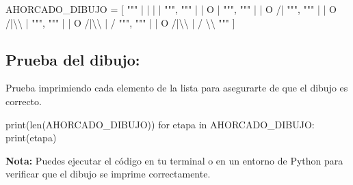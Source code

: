 \documentclass[
  a4paper,
  DIV=11,
  numbers=noendperiod,
  onepage,
  openany]{scrreprt}
\newenvironment{Shaded}{\begin{snugshade}}{\end{snugshade}}
\newcommand{\BuiltInTok}[1]{\textcolor[rgb]{0.00,0.23,0.31}{#1}}
\newcommand{\CharTok}[1]{\textcolor[rgb]{0.13,0.47,0.30}{#1}}
\newcommand{\ControlFlowTok}[1]{\textcolor[rgb]{0.00,0.23,0.31}{#1}}
\newcommand{\KeywordTok}[1]{\textcolor[rgb]{0.00,0.23,0.31}{#1}}
\newcommand{\NormalTok}[1]{\textcolor[rgb]{0.00,0.23,0.31}{#1}}
\newcommand{\OperatorTok}[1]{\textcolor[rgb]{0.37,0.37,0.37}{#1}}
\newcommand{\StringTok}[1]{\textcolor[rgb]{0.13,0.47,0.30}{#1}}
\begin{document}
\begin{Shaded}
\begin{Highlighting}[]
\NormalTok{AHORCADO\_DIBUJO }\OperatorTok{=}\NormalTok{ [}
    \StringTok{"""}
\StringTok{       |}
\StringTok{       |}
\StringTok{       |}
\StringTok{       |}
\StringTok{    """}\NormalTok{,}
    \StringTok{"""}
\StringTok{       |}
\StringTok{       |}
\StringTok{       O}
\StringTok{       |}
\StringTok{    """}\NormalTok{,}
    \StringTok{"""}
\StringTok{       |}
\StringTok{       |}
\StringTok{       O}
\StringTok{      /|}
\StringTok{    """}\NormalTok{,}
    \StringTok{"""}
\StringTok{       |}
\StringTok{       |}
\StringTok{       O}
\StringTok{      /|}\CharTok{\textbackslash{}\textbackslash{}}
\StringTok{       |}
\StringTok{    """}\NormalTok{,}
    \StringTok{"""}
\StringTok{       |}
\StringTok{       |}
\StringTok{       O}
\StringTok{      /|}\CharTok{\textbackslash{}\textbackslash{}}
\StringTok{       |}
\StringTok{      /}
\StringTok{    """}\NormalTok{,}
    \StringTok{"""}
\StringTok{       |}
\StringTok{       |}
\StringTok{       O}
\StringTok{      /|}\CharTok{\textbackslash{}\textbackslash{}}
\StringTok{       |}
\StringTok{      / }\CharTok{\textbackslash{}\textbackslash{}}
\StringTok{    """}
\NormalTok{]}
\end{Highlighting}
\end{Shaded}

\subsection{Prueba del dibujo:}\label{prueba-del-dibujo}

Prueba imprimiendo cada elemento de la lista para asegurarte de que el
dibujo es correcto.

\begin{Shaded}
\begin{Highlighting}[]
\BuiltInTok{print}\NormalTok{(}\BuiltInTok{len}\NormalTok{(AHORCADO\_DIBUJO))}
\ControlFlowTok{for}\NormalTok{ etapa }\KeywordTok{in}\NormalTok{ AHORCADO\_DIBUJO:}
    \BuiltInTok{print}\NormalTok{(etapa)}
\end{Highlighting}
\end{Shaded}

\begin{tcolorbox}[enhanced jigsaw, bottomrule=.15mm, rightrule=.15mm, colframe=quarto-callout-tip-color-frame, arc=.35mm, breakable, colbacktitle=quarto-callout-tip-color!10!white, toptitle=1mm, colback=white, opacitybacktitle=0.6, opacityback=0, bottomtitle=1mm, toprule=.15mm, titlerule=0mm, left=2mm, coltitle=black, leftrule=.75mm, title=\textcolor{quarto-callout-tip-color}{\faLightbulb}\hspace{0.5em}{Tip}]

\textbf{Nota:} Puedes ejecutar el código en tu terminal o en un entorno
de Python para verificar que el dibujo se imprime correctamente.

\end{tcolorbox}
\end{document}
